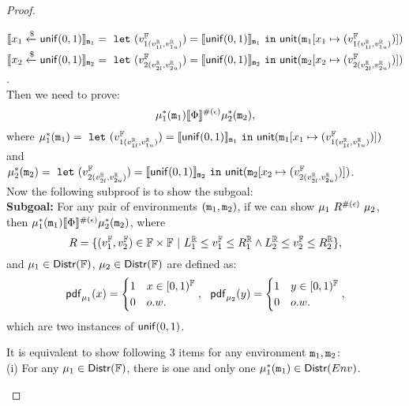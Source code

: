 \documentclass[a4paper,11pt]{article}
\begin{document}
\begin{proof}
\begin{itemize}
	$\llbracket x_1 \xleftarrow{\$} \mathsf{unif}(0, 1) \rrbracket_{\mathtt{m}_1} =
	~\mathtt{let}~ (v^{\mathbb{F}}_{1(v^{\mathbb{R}}_{1l}, v^{\mathbb{R}}_{1u})}) 
	= \llbracket \mathsf{unif}(0, 1) \rrbracket_{\mathtt{m}_1} 
	~\mathtt{in}~ 
	\mathsf{unit}(\mathtt{m}_1[x_1 \mapsto (v^{\mathbb{F}}_{1(v^{\mathbb{R}}_{1l}, v^{\mathbb{R}}_{1u})})])
	$
	\\
	$\llbracket x_2 \xleftarrow{\$} \mathsf{unif}(0, 1) \rrbracket_{\mathtt{m}_2} = 
	~\mathtt{let}~ (v^{\mathbb{F}}_{2(v^{\mathbb{R}}_{2l}, v^{\mathbb{R}}_{2u})}) 
	= \llbracket \mathsf{unif}(0, 1) \rrbracket_{\mathtt{m}_2} 
	~\mathtt{in}~ 
	\mathsf{unit}(\mathtt{m}_2[x_2 \mapsto (v^{\mathbb{F}}_{2(v^{\mathbb{R}}_{2l}, v^{\mathbb{R}}_{2u})})])
	$. \\
	Then we need to prove:
	\[\mu^*_1(\mathtt{m}_1) \llbracket \Phi \rrbracket^{\#(\epsilon)} \mu^*_2(\mathtt{m}_2),\]
	where 
	$\mu^*_1(\mathtt{m}_1) = ~\mathtt{let}~ (v^{\mathbb{F}}_{1(v^{\mathbb{R}}_{1l}, v^{\mathbb{R}}_{1u})}) 
	= \llbracket \mathsf{unif}(0, 1) \rrbracket_{\mathtt{m}_1} 
	~\mathtt{in}~ 
	\mathsf{unit}(\mathtt{m}_1[x_1 \mapsto (v^{\mathbb{F}}_{1(v^{\mathbb{R}}_{1l}, v^{\mathbb{R}}_{1u})})])$ and
	\\
	$\mu^*_2(\mathtt{m}_2) = ~\mathtt{let}~ (v^{\mathbb{F}}_{2(v^{\mathbb{R}}_{2l}, v^{\mathbb{R}}_{2u})}) 
	= \llbracket \mathsf{unif}(0, 1) \rrbracket_{\mathtt{m}_2} 
	~\mathtt{in}~
	\mathsf{unit}(\mathtt{m}_2[x_2 \mapsto (v^{\mathbb{F}}_{2(v^{\mathbb{R}}_{2l}, v^{\mathbb{R}}_{2u})})])$.
	\\
	Now the following subproof is to show the subgoal:
	\\
	\textbf{Subgoal:} For any pair of environments $(\mathtt{m}_1, \mathtt{m}_2)$, if we can show ${\mu_1} ~ R^{\#(\epsilon)} ~ {\mu_2}$, then $\mu^*_1(\mathtt{m}_1) \llbracket \Phi \rrbracket^{\#(\epsilon)} \mu^*_2(\mathtt{m}_2)$,
	where
	\[
		R = 
		\{(v^{\mathbb{F}}_1, v^{\mathbb{F}}_2) \in \mathbb{F} \times \mathbb{F} 
		~|~
		L^{\mathbb{R}}_1 \leq v^{\mathbb{F}}_1 \leq R^{\mathbb{R}}_1 
		\land 
		L^{\mathbb{R}}_2 \leq v^{\mathbb{F}}_2 \leq R^{\mathbb{R}}_2
		\},
	\]
	and  ${\mu_1} \in \mathsf{Distr}(\mathbb{F})$, ${\mu_2} \in \mathsf{Distr}(\mathbb{F})$ 
	are defined as:
	\[
		\mathsf{pdf}_{\mu_1}(x) = 
		\begin{cases}
		1 & x \in [0, 1)^{\mathbb{F}} 
		\\
		0       & o.w.
		\end{cases} ,
		~~
		\mathsf{pdf}_{\mu_2}(y) = 
		\begin{cases}
		1 & y \in [0, 1)^{\mathbb{F}}
		\\
		0       & o.w.
		\end{cases},
	\]
	which are two instances of $\mathsf{unif}(0, 1)$.
	\begin{subproof}
	It is equivalent to show following 3 items for any environment $\mathtt{m}_1, \mathtt{m}_2$:
	\\
	(i) For any $\mu_1 \in \mathsf{Distr}(\mathbb{F})$, there is one and only one $\mu^*_1(\mathtt{m}_1) \in \mathsf{Distr}(Env)$.

\end{subproof}
\end{itemize}
\end{proof}
\end{document}
